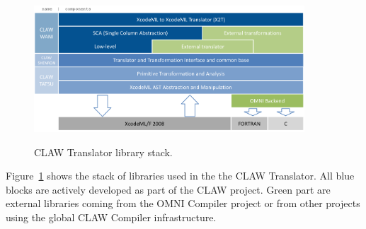\begin{figure}[!ht]
  \centering
  \includegraphics[width=0.9\textwidth]{../../resources/clawx2t_stack.png} \\
  \caption{CLAW \xcodemlf Translator library stack.}
  \label{fig:clawx2_stack}
\end{figure}

Figure~\ref{fig:clawx2_stack} shows the stack of libraries used in the the CLAW
\xcodemlf Translator. All blue blocks are actively developed as part of the CLAW
project. Green part are external libraries coming from the OMNI Compiler project
or from other projects using the global CLAW Compiler infrastructure.
